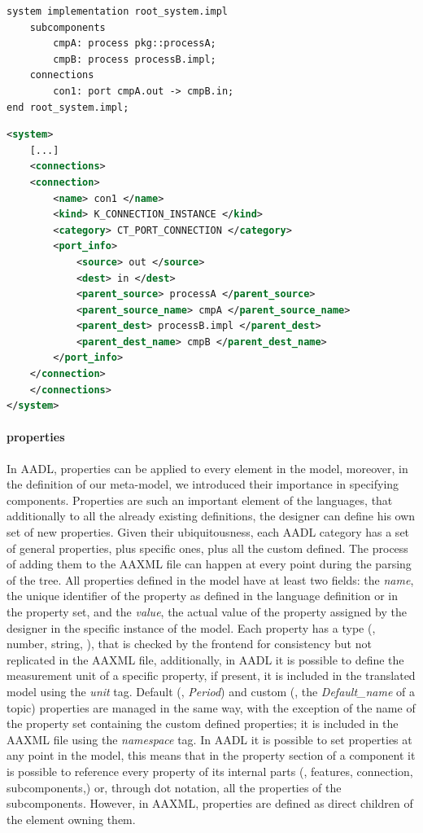 \begin{lstlisting}[language=AADL,caption={Minimal AADL model containing connections.},label=lst:con-aadl]
system implementation root_system.impl
	subcomponents
		cmpA: process pkg::processA;
		cmpB: process processB.impl;
	connections
		con1: port cmpA.out -> cmpB.in;
end root_system.impl;
\end{lstlisting}

\begin{lstlisting}[language=XML,caption={AAXML description of AADL connections},label=lst:con-aaxml]
<system>
	[...]
	<connections>
	<connection>
		<name> con1 </name>
		<kind> K_CONNECTION_INSTANCE </kind>
		<category> CT_PORT_CONNECTION </category>
		<port_info>
			<source> out </source>
			<dest> in </dest>
			<parent_source> processA </parent_source>
			<parent_source_name> cmpA </parent_source_name>
			<parent_dest> processB.impl </parent_dest>
			<parent_dest_name> cmpB </parent_dest_name>
		</port_info>
	</connection>
	</connections>
</system>
\end{lstlisting}

\paragraph{properties} In AADL, properties can be applied to every element in the model, moreover, in the definition of our meta-model, we introduced their importance in specifying components. Properties are such an important element of the languages, that additionally to all the already existing definitions, the designer can define his own set of new properties. Given their ubiquitousness, each AADL category has a set of general properties, plus specific ones, plus all the custom defined. The process of adding them to the AAXML file can happen at every point during the parsing of the tree. All properties defined in the model have at least two fields: the \textit{name}, the unique identifier of the property as defined in the language definition or in the property set, and the \textit{value}, the actual value of the property assigned by the designer in the specific instance of the model. Each property has a type (\eg, number, string, \etc), that is checked by the frontend for consistency but not replicated in the AAXML file, additionally, in AADL it is possible to define the measurement unit of a specific property, if present, it is included in the translated model using the \textit{unit} tag. Default (\eg, \textit{Period}) and custom (\eg, the \textit{Default\_name} of a topic) properties are managed in the same way, with the exception of the name of the property set containing the custom defined properties; it is included in the AAXML file using the \textit{namespace} tag. In AADL it is possible to set properties at any point in the model, this means that in the property section of a component it is possible to reference every property of its internal parts (\eg, features, connection, subcomponents,\etc) or, through dot notation, all the properties of the subcomponents. However, in AAXML, properties are defined as direct children of the element owning them.

